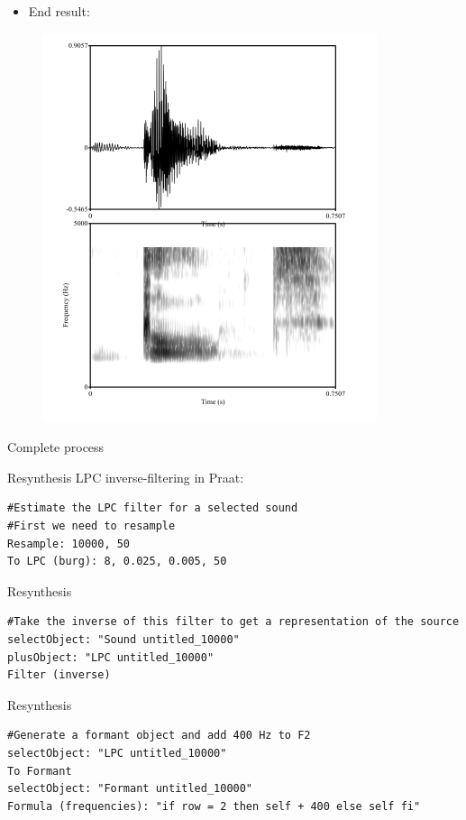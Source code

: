 \documentclass{beamer}
\begin{document}
\begin{frame}
\begin{itemize}
\item{End result:}
\end{itemize}
\begin{figure}
\includegraphics[scale=0.5,keepaspectratio]{final.png}
\end{figure}
\end{frame}
\begin{frame}{Complete process}
\end{frame}
\begin{frame}[fragile]{Resynthesis}
LPC inverse-filtering in Praat:
\begin{lstlisting}
#Estimate the LPC filter for a selected sound
#First we need to resample
Resample: 10000, 50
To LPC (burg): 8, 0.025, 0.005, 50
\end{lstlisting}
\end{frame}
\begin{frame}[fragile]{Resynthesis}
\begin{lstlisting}
#Take the inverse of this filter to get a representation of the source
selectObject: "Sound untitled_10000"
plusObject: "LPC untitled_10000"
Filter (inverse)
\end{lstlisting}
\end{frame}
\begin{frame}[fragile]{Resynthesis}
\begin{lstlisting}
#Generate a formant object and add 400 Hz to F2
selectObject: "LPC untitled_10000"
To Formant
selectObject: "Formant untitled_10000"
Formula (frequencies): "if row = 2 then self + 400 else self fi"
\end{lstlisting}
\end{frame}
\end{document}
